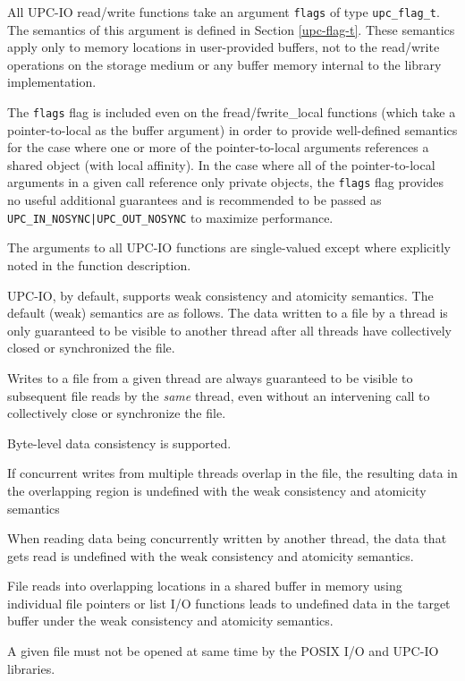 \np All UPC-IO read/write functions take an argument {\tt flags}
    of type {\tt upc\_flag\_t}. The semantics of this argument is
    defined in Section \ref{upc-flag-t}. These semantics apply only to
    memory locations in user-provided buffers, not to the read/write
    operations on the storage medium or any buffer memory internal to
    the library implementation.


\np The {\tt flags} flag is included even on the fread/fwrite\_local functions
(which take a pointer-to-local as the buffer argument) in order to provide
well-defined semantics for the case where one or more of the pointer-to-local
arguments references a shared object (with local affinity). In the case where
all of the pointer-to-local arguments in a given call reference only private
objects, the {\tt flags} flag provides no useful additional guarantees and is
recommended to be passed as {\tt UPC\_IN\_NOSYNC|UPC\_OUT\_NOSYNC} to maximize performance.

\np The arguments to all UPC-IO functions are single-valued except where 
    explicitly noted in the function description.

\np UPC-IO, by default, supports weak consistency and atomicity semantics. The
default (weak) semantics are as follows. The data written to a file by a thread is
only guaranteed to be visible to another thread after all threads have
collectively closed or synchronized the file.

\np Writes to a file from a given thread are always guaranteed to be visible to
subsequent file reads by the \textit{same} thread, even without an intervening
call to collectively close or synchronize the file.

\np Byte-level data consistency is supported.

\np If concurrent writes from multiple threads overlap in the file, the
resulting data in the overlapping region is undefined with the weak
consistency and atomicity semantics

\np When reading data being concurrently written by another thread, the data
that gets read is undefined with the weak consistency and atomicity
semantics.

\np File reads into overlapping locations in a shared buffer in memory using individual file
pointers or list I/O functions leads to undefined data in the target buffer under the
weak consistency and atomicity semantics.

\np A given file must not be opened at same time by the POSIX I/O
and UPC-IO libraries.

